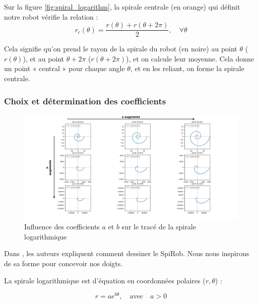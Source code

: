 \documentclass[a4paper, 11pt]{report}
\begin{document}
            Sur la figure \ref{fig:spiral_logarithm}, la spirale centrale (en orange) qui définit notre robot vérifie la relation :
            \begin{equation}
            r_c(\theta) = \frac{r(\theta) + r(\theta + 2\pi)}{2}, \quad \forall \theta
            \label{eq:spirale_centrale}
            \end{equation}
            
            Cela signifie qu’on prend le rayon de la spirale du robot (en noire) au point $\theta$ ($r(\theta)$), et au point $\theta + 2\pi$ ($r(\theta + 2\pi)$), et on calcule leur moyenne. Cela donne un point « central » pour chaque angle $\theta$, et en les reliant, on forme la spirale centrale. \cite{wang_spirobs_2025}

        \subsubsection{Choix et détermination des coefficients}

            \begin{figure}
                \centering
                \includegraphics[width=1\textwidth]{Figures/spirale.png}
                \caption{Influence des coefficients $a$ et $b$ sur le tracé de la spirale logarithmique}
                \label{fig:spirale}
            \end{figure}
        
            Dans \cite{wang_spirobs_2025}, les auteurs expliquent comment dessiner le SpiRob. Nous nous inspirons de sa forme pour concevoir nos doigts.
        
            La spirale logarithmique est d'équation en coordonnées polaires ($r, \theta$) :

            \begin{equation}
                r = ae^{b\theta}, \quad \text{avec} \quad a > 0
                \label{eq:spirale_log}
            \end{equation}
            
\end{document}
